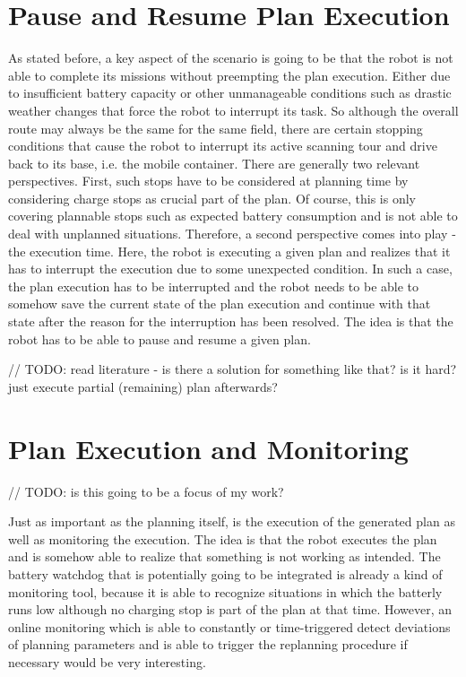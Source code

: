\documentclass[german, master, expose, latin1]{base/thesis_KBS}
\begin{document}
\section{Pause and Resume Plan Execution}

As stated before, a key aspect of the scenario is going to be that the robot is not able to complete its missions without preempting the plan execution.
Either due to insufficient battery capacity or other unmanageable conditions such as drastic weather changes that force the robot to interrupt its task.
So although the overall route may always be the same for the same field, there are certain stopping conditions that cause the robot to interrupt its 
active scanning tour and drive back to its base, i.e. the mobile container.
There are generally two relevant perspectives. First, such stops have to be considered at planning time by considering charge stops as crucial part of the plan.
Of course, this is only covering plannable stops such as expected battery consumption and is not able to deal with unplanned situations.
Therefore, a second perspective comes into play - the execution time. Here, the robot is executing a given plan and realizes that it has to interrupt the execution
due to some unexpected condition. In such a case, the plan execution has to be interrupted and the robot needs to be able to somehow save the current state of the plan
execution and continue with that state after the reason for the interruption has been resolved.
The idea is that the robot has to be able to pause and resume a given plan.\newline

// TODO: read literature - is there a solution for something like that? is it hard? just execute partial (remaining) plan afterwards?

\section{Plan Execution and Monitoring}

// TODO: is this going to be a focus of my work?\newline

Just as important as the planning itself, is the execution of the generated plan as well as monitoring the execution.
The idea is that the robot executes the plan and is somehow able to realize that something is not working as intended. 
The battery watchdog that is potentially going to be integrated is already a kind of monitoring tool, because it is able to recognize situations 
in which the batterly runs low although no charging stop is part of the plan at that time. However, an online monitoring which is able to constantly or time-triggered 
detect deviations of planning parameters and is able to trigger the replanning procedure if necessary would be very interesting.\newline
\end{document}
